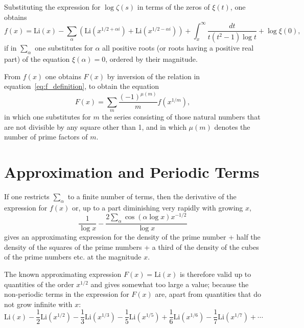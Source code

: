 \documentclass[12pt]{article}
\begin{document}
Substituting the expression for $\log \zeta(s)$ in terms of the zeros of $\xi(t)$, one obtains
\begin{equation}
f(x) = \text{Li}(x) - \sum_{\alpha} \left(\text{Li}(x^{1/2+\alpha i}) + \text{Li}(x^{1/2-\alpha i})\right) + \int_x^{\infty} \frac{dt}{t(t^2-1)\log t} + \log \xi(0),
\label{eq:explicit_formula}
\end{equation}
if in $\sum_{\alpha}$ one substitutes for $\alpha$ all positive roots (or roots having a positive real part) of the equation $\xi(\alpha) = 0$, ordered by their magnitude.

From $f(x)$ one obtains $F(x)$ by inversion of the relation in equation~\eqref{eq:f_definition}, to obtain the equation
\begin{equation}
F(x) = \sum_{m} \frac{(-1)^{\mu(m)}}{m} f(x^{1/m}),
\label{eq:mobius_inversion}
\end{equation}
in which one substitutes for $m$ the series consisting of those natural numbers that are not divisible by any square other than 1, and in which $\mu(m)$ denotes the number of prime factors of $m$.

\section{Approximation and Periodic Terms}

If one restricts $\sum_{\alpha}$ to a finite number of terms, then the derivative of the expression for $f(x)$ or, up to a part diminishing very rapidly with growing $x$,
\begin{equation}
\frac{1}{\log x} - \frac{2\sum_{\alpha} \cos(\alpha \log x) x^{-1/2}}{\log x}
\label{eq:prime_density_approximation}
\end{equation}
gives an approximating expression for the density of the prime number + half the density of the squares of the prime numbers + a third of the density of the cubes of the prime numbers etc. at the magnitude $x$.

The known approximating expression $F(x) = \text{Li}(x)$ is therefore valid up to quantities of the order $x^{1/2}$ and gives somewhat too large a value; because the non-periodic terms in the expression for $F(x)$ are, apart from quantities that do not grow infinite with $x$:
\begin{equation}
\text{Li}(x) - \frac{1}{2}\text{Li}(x^{1/2}) - \frac{1}{3}\text{Li}(x^{1/3}) - \frac{1}{5}\text{Li}(x^{1/5}) + \frac{1}{6}\text{Li}(x^{1/6}) - \frac{1}{7}\text{Li}(x^{1/7}) + \cdots
\label{eq:nonperiodic_terms}
\end{equation}
\end{document}
